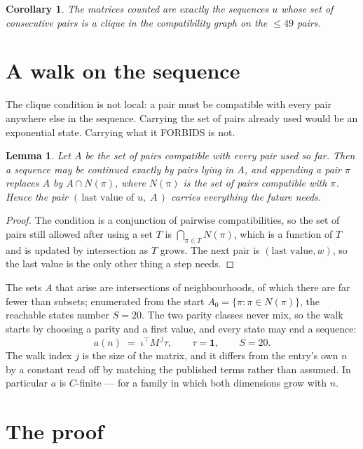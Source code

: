 \documentclass[11pt,a4paper]{article}
\theoremstyle{plain}
\newtheorem{lemma}[theorem]{Lemma}
\newtheorem{corollary}[theorem]{Corollary}
\theoremstyle{definition}
\begin{document}
\begin{corollary}
The matrices counted are exactly the sequences $u$ whose set of consecutive pairs is a clique in
the compatibility graph on the $\le 49$ pairs.
\end{corollary}

\section{A walk on the sequence}

The clique condition is not local: a pair must be compatible with every pair anywhere else in
the sequence. Carrying the set of pairs already used would be an exponential state. Carrying
what it FORBIDS is not.

\begin{lemma}\label{lem:lump}
Let $A$ be the set of pairs compatible with every pair used so far. Then a sequence may be
continued exactly by pairs lying in $A$, and appending a pair $\pi$ replaces $A$ by
$A\cap N(\pi)$, where $N(\pi)$ is the set of pairs compatible with $\pi$. Hence the pair
$(\,\text{last value of }u,\;A\,)$ carries everything the future needs.
\end{lemma}

\begin{proof}
The condition is a conjunction of pairwise compatibilities, so the set of pairs still allowed
after using a set $T$ is $\bigcap_{\pi\in T}N(\pi)$, which is a function of $T$ and is updated
by intersection as $T$ grows. The next pair is $(\text{last value},w)$, so the last value is
the only other thing a step needs.
\end{proof}

The sets $A$ that arise are intersections of neighbourhoods, of which there are far fewer than
subsets; enumerated from the start $A_0=\{\pi:\pi\in N(\pi)\}$, the reachable states number
$S=20$. The two parity classes never mix, so the walk starts by choosing a parity and a first
value, and every state may end a sequence:
\[
a(n)\;=\;\iota^{\!\top}M^{\,j}\tau ,\qquad \tau=\mathbf{1},\qquad S=20.
\]
The walk index $j$ is the size of the matrix, and it differs from the entry's own $n$ by a
constant read off by matching the published terms rather than assumed. In particular $a$ is
$C$-finite --- for a family in which both dimensions grow with $n$.

\section{The proof}
\end{document}
